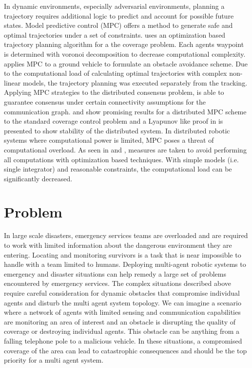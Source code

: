 \documentclass{article}
\begin{document}
In dynamic environments, especially adversarial environments, planning a trajectory requires additional logic to predict and account for possible future states. Model predictive control (MPC) offers a method to generate safe and optimal trajectories under a set of constraints. \cite{nguyen} uses an optimization based trajectory planning algorithm for a the coverage problem. Each agents waypoint is determined with voronoi decomposition to decrease computational complexity.  \cite{park} applies MPC to a ground vehicle to formulate an obstacle avoidance scheme. Due to the computational load of calculating optimal trajectories with complex non-linear models, the trajectory planning was executed separately from the tracking. Applying MPC strategies to the distributed consensus problem, \cite{ferarri} is able to guarantee consensus under certain connectivity assumptions for the communication graph. \cite{mohseni1} and \cite{mohseni2} show promising results for a distributed MPC scheme to the standard coverage control problem and a Lyapunov like proof in \cite{mohseni2} is presented to show stability of the distributed system. In distributed robotic systems where computational power is limited, MPC poses a threat of computational overload. As seen in \cite{nguyen} and \cite{park}, measures are taken to avoid performing all computations with optimization based techniques. With simple models (i.e. single integrator) and reasonable constraints, the computational load can be significantly decreased. 





\section{Problem}

In large scale disasters, emergency services teams are overloaded and are required to work with limited information about the dangerous environment they are entering. Locating and monitoring survivors is a task that is near impossible to handle with a team limited to humans. Deploying multi-agent robotic systems to emergency and disaster situations can help remedy a large set of problems encountered by emergency services. The complex situations described above require careful consideration for dynamic obstacles that compromise individual agents and disturb the multi agent system topology. We can imagine a scenario where a network of agents with limited sensing and communication capabilities are monitoring an area of interest and an obstacle is disrupting the quality of coverage or destroying individual agents. This obstacle can be anything from a falling telephone pole to a malicious vehicle. In these situations, a compromised coverage of the area can lead to catastrophic consequences and should be the top priority for a multi agent system.
\end{document}
